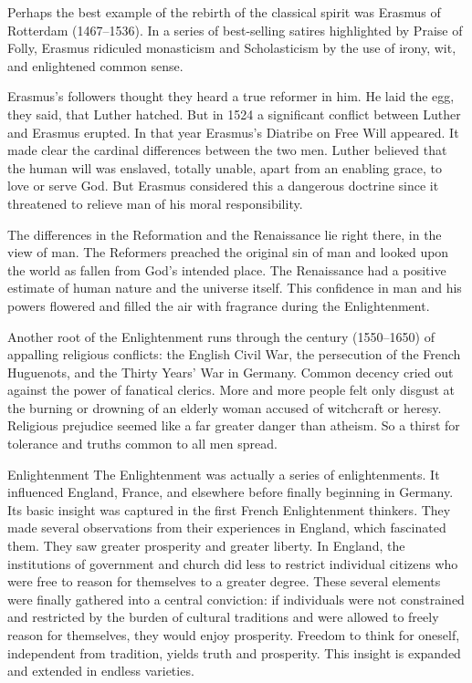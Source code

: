Perhaps the best example of the rebirth of the classical spirit was Erasmus of Rotterdam
(1467–1536). In a series of best-selling satires highlighted by Praise of Folly, Erasmus ridiculed
monasticism and Scholasticism by the use of irony, wit, and enlightened common sense.

Erasmus’s followers thought they heard a true reformer in him. He laid the egg, they said, that
Luther hatched. But in 1524 a significant conflict between Luther and Erasmus erupted. In that year
Erasmus’s Diatribe on Free Will appeared. It made clear the cardinal differences between the two
men. Luther believed that the human will was enslaved, totally unable, apart from an enabling grace,
to love or serve God. But Erasmus considered this a dangerous doctrine since it threatened to
relieve man of his moral responsibility.

The differences in the Reformation and the Renaissance lie right there, in the view of man. The
Reformers preached the original sin of man and looked upon the world as fallen from God’s intended
place. The Renaissance had a positive estimate of human nature and the universe itself. This
confidence in man and his powers flowered and filled the air with fragrance during the
Enlightenment.

Another root of the Enlightenment runs through the century (1550–1650) of appalling religious
conflicts: the English Civil War, the persecution of the French Huguenots, and the Thirty Years’ War
in Germany. Common decency cried out against the power of fanatical clerics. More and more people
felt only disgust at the burning or drowning of an elderly woman accused of witchcraft or heresy.
Religious prejudice seemed like a far greater danger than atheism. So a thirst for tolerance and
truths common to all men spread.

\begin{sidebar}{Enlightenment}
The Enlightenment was actually a series of enlightenments. It influenced England, France, and
elsewhere before finally beginning in Germany. Its basic insight was captured in the first French
Enlightenment thinkers. They made several observations from their experiences in England, which
fascinated them. They saw greater prosperity and greater liberty. In England, the institutions of
government and church did less to restrict individual citizens who were free to reason for
themselves to a greater degree. These several elements were finally gathered into a central
conviction: if individuals were not constrained and restricted by the burden of cultural traditions
and were allowed to freely reason for themselves, they would enjoy prosperity. Freedom to think for
oneself, independent from tradition, yields truth and prosperity. This insight is expanded and
extended in endless varieties.
\end{sidebar}

